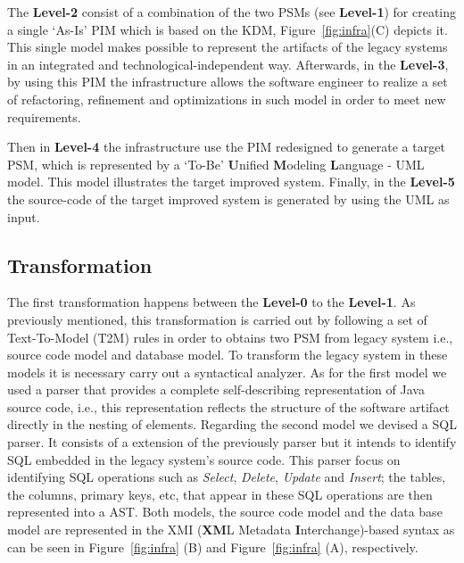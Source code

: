 The \textbf{Level-2} consist of a combination of the two PSMs (see \textbf{Level-1}) for creating a single `As-Is' PIM which is based on the KDM, Figure~\ref{fig:infra}(C) depicts it. This single model makes possible to represent the artifacts of the legacy systems in an integrated and technological-independent way. %
Afterwards, in the \textbf{Level-3}, by using this PIM the infrastructure allows the software engineer to realize a set of refactoring, refinement and optimizations in such model in order to meet new requirements. %

Then in \textbf{Level-4} the infrastructure use the PIM redesigned to generate a target PSM, which is represented by a `To-Be' \textbf{U}nified \textbf{M}odeling \textbf{L}anguage - UML model. This model illustrates the target improved system. Finally, in the \textbf{Level-5} the source-code of the target improved system is generated by using the UML as input.

\subsection{Transformation}\label{subsection:transformation}

The first transformation happens between the \textbf{Level-0} to the \textbf{Level-1}. As previously mentioned, this transformation is carried out by following a set of Text-To-Model (T2M) rules in order to obtains two PSM from legacy system i.e., source code model and database model. To transform the legacy system in these models it is necessary carry out a syntactical analyzer. As for the first model we used a parser that provides a complete self-describing representation of Java source code, i.e., this representation reflects the structure of the software artifact directly in the nesting of elements. Regarding the second model we devised a SQL parser. It consists of a extension of the previously parser but it intends to identify SQL embedded in the legacy system's source code. This parser focus on identifying SQL operations such as \textit{Select}, \textit{Delete}, \textit{Update} and \textit{Insert}; the tables, the columns, primary keys, etc, that appear in these SQL operations are then represented into a AST. Both models, the source code model and the data base model  are represented in the XMI (\textbf{XM}L Metadata \textbf{I}nterchange)-based syntax as can be seen in Figure~\ref{fig:infra} (B) and Figure~\ref{fig:infra} (A), respectively. 

